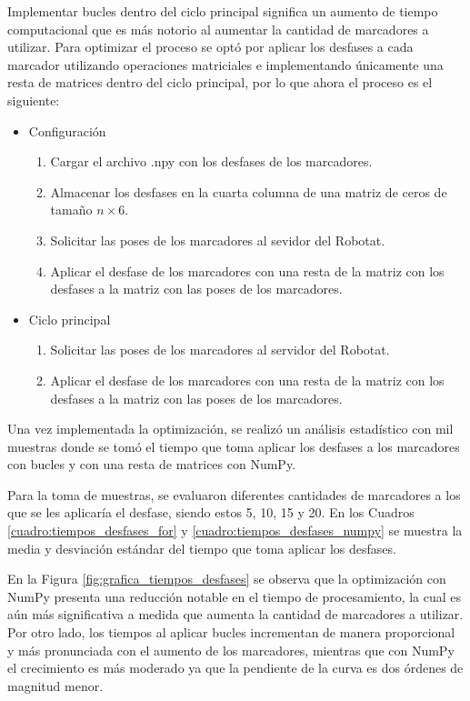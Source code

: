 Implementar bucles dentro del ciclo principal significa un aumento de tiempo computacional que es más notorio al aumentar la cantidad de marcadores a utilizar. Para optimizar el proceso se optó por aplicar los desfases a cada marcador utilizando operaciones matriciales e implementando únicamente una resta de matrices dentro del ciclo principal, por lo que ahora el proceso es el siguiente:

\begin{itemize}
	\item Configuración
	\begin{enumerate}
		\item Cargar el archivo .npy con los desfases de los marcadores.
		\item Almacenar los desfases en la cuarta columna de una matriz de ceros de tamaño $n \times 6$.
		\item Solicitar las poses de los marcadores al sevidor del Robotat.
		\item Aplicar el desfase de los marcadores con una resta de la matriz con los desfases a la matriz con las poses de los marcadores.
	\end{enumerate}
	\item Ciclo principal 
	\begin{enumerate}
		\item Solicitar las poses de los marcadores al servidor del Robotat.
		\item Aplicar el desfase de los marcadores con una resta de la matriz con los desfases a la matriz con las poses de los marcadores.
	\end{enumerate}
\end{itemize}

Una vez implementada la optimización, se realizó un análisis estadístico con mil muestras donde se tomó el tiempo que toma aplicar los desfases a los marcadores con bucles y con una resta de matrices con NumPy.

Para la toma de muestras, se evaluaron diferentes cantidades de marcadores a los que se les aplicaría el desfase, siendo estos 5, 10, 15 y 20. En los Cuadros \ref{cuadro:tiempos_desfases_for} y \ref{cuadro:tiempos_desfases_numpy} se muestra la media y desviación estándar del tiempo que toma aplicar los desfases.

En la Figura \ref{fig:grafica_tiempos_desfases} se observa que la optimización con NumPy presenta una reducción notable en el tiempo de procesamiento, la cual es aún más significativa a medida que aumenta la cantidad de marcadores a utilizar. Por otro lado, los tiempos al aplicar bucles incrementan de manera proporcional y más pronunciada con el aumento de los marcadores, mientras que con NumPy el crecimiento es más moderado ya que la pendiente de la curva es dos órdenes de magnitud menor.

